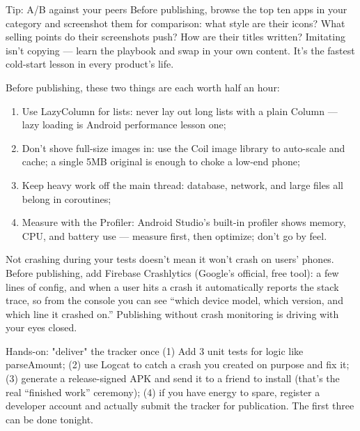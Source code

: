 \begin{tcbinfo}{Tip: A/B against your peers}
Before publishing, browse the top ten apps in your category and screenshot them for comparison: what style are their icons? What selling points do their screenshots push? How are their titles written? Imitating isn't copying — learn the playbook and swap in your own content. It's the fastest cold-start lesson in every product's life.

\end{tcbinfo}


Before publishing, these two things are each worth half an hour:


\begin{enumerate}
  \item Use LazyColumn for lists: never lay out long lists with a plain Column — lazy loading is Android performance lesson one;
  \item Don't shove full-size images in: use the Coil image library to auto-scale and cache; a single 5MB original is enough to choke a low-end phone;
  \item Keep heavy work off the main thread: database, network, and large files all belong in coroutines;
  \item Measure with the Profiler: Android Studio's built-in profiler shows memory, CPU, and battery use — measure first, then optimize; don't go by feel.
\end{enumerate}


Not crashing during your tests doesn't mean it won't crash on users' phones. Before publishing, add Firebase Crashlytics (Google's official, free tool): a few lines of config, and when a user hits a crash it automatically reports the stack trace, so from the console you can see “which device model, which version, and which line it crashed on.” Publishing without crash monitoring is driving with your eyes closed.

\begin{tcbpractice}{Hands-on: "deliver" the tracker once}
(1) Add 3 unit tests for logic like parseAmount; (2) use Logcat to catch a crash you created on purpose and fix it; (3) generate a release-signed APK and send it to a friend to install (that's the real “finished work” ceremony); (4) if you have energy to spare, register a developer account and actually submit the tracker for publication. The first three can be done tonight.

\end{tcbpractice}


